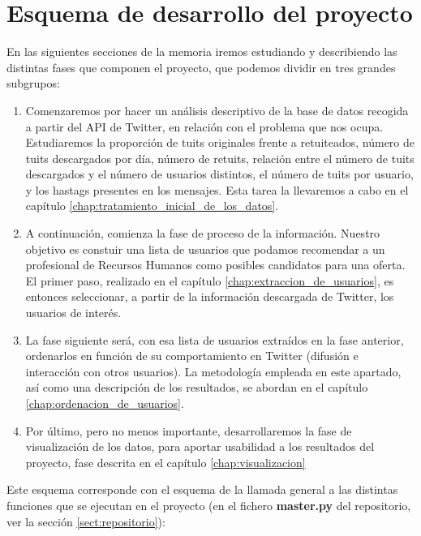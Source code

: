\section{Esquema de desarrollo del proyecto}
En las siguientes secciones de la memoria iremos estudiando y describiendo las distintas
fases que componen el proyecto, que podemos dividir en tres grandes subgrupos:
\begin{enumerate}
\item Comenzaremos por hacer un análisis descriptivo de la base de datos recogida a partir del API de Twitter, en relación con el problema que nos ocupa. Estudiaremos la proporción de tuits originales
frente a retuiteados, número de tuits descargados por día, número de retuits, relación entre el 
número de tuits descargados y el número de usuarios distintos, el número de tuits por usuario, y
los hastags presentes en los mensajes. Esta tarea la llevaremos a cabo en el capítulo \ref{chap:tratamiento_inicial_de_los_datos}.

\item A continuación, comienza la fase de proceso de la información. Nuestro objetivo es 
constuir una lista de usuarios que podamos recomendar a un profesional de Recursos Humanos como
posibles candidatos para una oferta. El primer paso, realizado en el capítulo \ref{chap:extraccion_de_usuarios}, es entonces seleccionar, a partir de la información descargada de Twitter, los usuarios de interés. 

\item La fase siguiente será, con esa lista de usuarios extraídos en la fase anterior, ordenarlos
en función de su comportamiento en Twitter (difusión e interacción con otros usuarios). 
La metodología empleada en este apartado, así como una descripción de los resultados, 
se abordan en el capítulo \ref{chap:ordenacion_de_usuarios}.

\item Por último, pero no menos importante, desarrollaremos la fase de visualización de los
datos, para aportar usabilidad a los resultados del proyecto, fase descrita en el
capítulo \ref{chap:visualizacion}
\end{enumerate}

Este esquema corresponde con el esquema de la llamada general a las distintas funciones que se
ejecutan en el proyecto (en el fichero {\bf master.py} del repositorio, ver la sección
\ref{sect:repositorio}):

